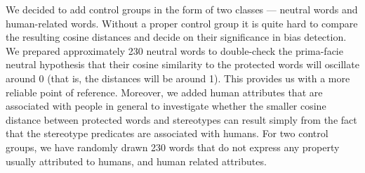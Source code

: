 \documentclass[
  12pt,
]{book}
\newenvironment{Shaded}{\begin{snugshade}}{\end{snugshade}}
\newcommand{\AttributeTok}[1]{\textcolor[rgb]{0.77,0.63,0.00}{#1}}
\newcommand{\CommentTok}[1]{\textcolor[rgb]{0.56,0.35,0.01}{\textit{#1}}}
\newcommand{\ConstantTok}[1]{\textcolor[rgb]{0.00,0.00,0.00}{#1}}
\newcommand{\DecValTok}[1]{\textcolor[rgb]{0.00,0.00,0.81}{#1}}
\newcommand{\FunctionTok}[1]{\textcolor[rgb]{0.00,0.00,0.00}{#1}}
\newcommand{\NormalTok}[1]{#1}
\newcommand{\OtherTok}[1]{\textcolor[rgb]{0.56,0.35,0.01}{#1}}
\newcommand{\SpecialCharTok}[1]{\textcolor[rgb]{0.00,0.00,0.00}{#1}}
\newcommand{\StringTok}[1]{\textcolor[rgb]{0.31,0.60,0.02}{#1}}
\begin{document}
We decided to add control groups in the form of two classes --- neutral words and human-related words. Without a proper control group it is quite hard to compare the resulting cosine distances and decide on their significance in bias detection. We prepared approximately 230 neutral words to double-check the prima-facie neutral hypothesis that their cosine similarity to the protected words will oscillate around 0 (that is, the distances will be around 1). This provides us with a more reliable point of reference. Moreover, we added human attributes that are associated with people in general to investigate whether the smaller cosine distance between protected words and stereotypes can result simply from the fact that the stereotype predicates are associated with humans. For two control groups, we have randomly drawn 230 words that do not express any property usually attributed to humans, and human related attributes.

\vspace{1mm}
\footnotesize

\begin{Shaded}
\end{Shaded}
\end{document}
